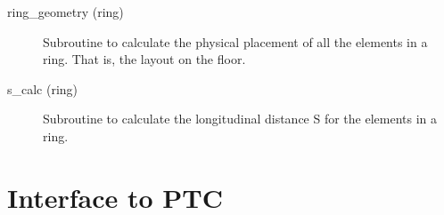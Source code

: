 \begin{description}

\item[ring\_geometry (ring)] \Newline
Subroutine to calculate the physical placement of all the elements in a ring. 
That is, the layout on the floor. 

\item[s\_calc (ring)] \Newline
Subroutine to calculate the longitudinal distance S for the elements in a ring. 

\end{description}

\section{Interface to PTC}
\label{r:ptc}      

